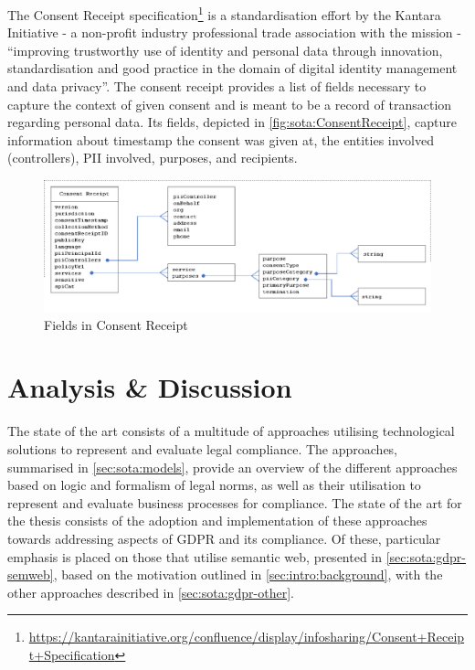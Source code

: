
The Consent Receipt specification\footnote{\url{https://kantarainitiative.org/confluence/display/infosharing/Consent+Receipt+Specification}} \cite{lizar_consent_2017} is a standardisation effort by the Kantara Initiative - a non-profit industry professional trade association with the mission - ``improving trustworthy use of identity and personal data through innovation, standardisation and good practice in the domain of digital identity management and data privacy''. The consent receipt provides a list of fields necessary to capture the context of given consent and is meant to be a record of transaction regarding personal data. Its fields, depicted in \autoref{fig:sota:ConsentReceipt}, capture information about timestamp the consent was given at, the entities involved (controllers), PII involved, purposes, and recipients.
\begin{figure}[htbp]
    \centering
    \includegraphics[width=\linewidth]{img/ConsentReceipt.png}
    \caption{Fields in Consent Receipt \cite{lizar_consent_2017}}
    \label{fig:sota:ConsentReceipt}
\end{figure}

\section{Analysis \& Discussion}\label{sec:sota:analysis}

The state of the art consists of a multitude of approaches utilising technological solutions to represent and evaluate legal compliance. The approaches, summarised in \autoref{sec:sota:models}, provide an overview of the different approaches based on logic and formalism of legal norms, as well as their utilisation to represent and evaluate business processes for compliance.
The state of the art for the thesis consists of the adoption and implementation of these approaches towards addressing aspects of GDPR and its compliance.
Of these, particular emphasis is placed on those that utilise semantic web, presented in \autoref{sec:sota:gdpr-semweb}, based on the motivation outlined in \autoref{sec:intro:background}, with the other approaches described in \autoref{sec:sota:gdpr-other}.

